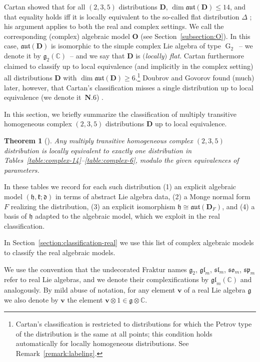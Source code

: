 \documentclass[10pt,a4paper]{amsart}
\DeclareMathOperator{\G} {G}
\newcommand{\bbC}{\mathbb{C}}
\newcommand{\mbD}{\mathbf{D}}
\newcommand{\mbO}{\mathbf{O}}
\newcommand{\mbv}{\mathbf{v}}
\newcommand{\mfd} {\mathfrak{d}}
\newcommand{\mfg} {\mathfrak{g}}
\newcommand{\mfh} {\mathfrak{h}}
\newcommand{\mfk} {\mathfrak{k}}
\newcommand{\mfaut}{\mathfrak{aut}}
\newcommand{\mfgl} {\mathfrak{gl}}
\newcommand{\mfsl} {\mathfrak{sl}}
\newcommand{\mfso} {\mathfrak{so}}
\newcommand{\mfsp} {\mathfrak{sp}}
\numberwithin{equation}{section}
\newtheorem{Theorem}{Theorem}[section]
\begin{document}
Cartan showed that for all $(2, 3, 5)$ distributions $\mbD$, $\dim \mfaut(\mbD) \leq 14$, and that equality holds iff it is locally equivalent to the so-called flat distribution $\Delta$ \cite{CartanFiveVariables}; his argument applies to both the real and complex settings. We call the corresponding (complex) algebraic model $\mbO$ (see Section~\ref{subsection:O}). In this case, $\mfaut(\mbD)$ is isomorphic to the simple complex Lie algebra of type $\G_2$~-- we denote it by $\mfg_2(\bbC)$~-- and we say that $\mbD$ is \textit{$($locally$)$ flat}. Cartan furthermore claimed to classify up to local equivalence (and implicitly in the complex setting) all distributions $\mbD$ with $\dim \mfaut(\mbD) \geq 6$.\footnote{Cartan's classification is restricted to distributions for which the Petrov type of the distribution is the same at all points; this condition holds automatically for locally homogeneous distributions. See Remark~\ref{remark:labeling}.\label{footnote:constant-type}} Doubrov and Govorov found (much) later, however, that Cartan's classification misses a single distribution up to local equivalence (we denote it~$\mathbf{N.6}$) \cite{DoubrovGovorovCounterexample, WillseCounterexample}.

In this section, we briefly summarize the classification of multiply transitive homogeneous complex $(2, 3, 5)$ distributions $\mbD$ up to local equivalence.

\begin{Theorem}[\cite{CartanFiveVariables, DoubrovGovorovCounterexample}]\label{theorem:complex-classification}
Any multiply transitive homogeneous complex $(2, 3, 5)$ distribution is locally equivalent to exactly one distribution in Tables~{\rm \ref{table:complex-14}--\ref{table:complex-6}}, modulo the given equivalences of parameters.
\end{Theorem}

In these tables we record for each such distribution (1) an explicit algebraic model $(\mfh, \mfk; \mfd)$ in terms of abstract Lie algebra data, (2) a Monge normal form $F$ realizing the distribution, (3) an explicit isomorphism $\mfh \cong \mfaut(\mbD_F)$, and (4) a basis of $\mfh$ adapted to the algebraic model, which we exploit in the real classification.

In Section~\ref{section:classification-real} we use this list of complex algebraic models to classify the real algebraic models.

We use the convention that the undecorated Fraktur names $\mfg_2$, $\mfgl_m$, $\mfsl_m$, $\mfso_m$, $\mfsp_m$ refer to real Lie algebras, and we denote their complexifications by $\mfgl_m(\bbC)$ and analogously. By mild abuse of notation, for any element $\mbv$ of a real Lie algebra $\mfg$ we also denote by $\mbv$ the element $\mbv \otimes 1 \in \mfg \otimes \bbC$.
\end{document}
